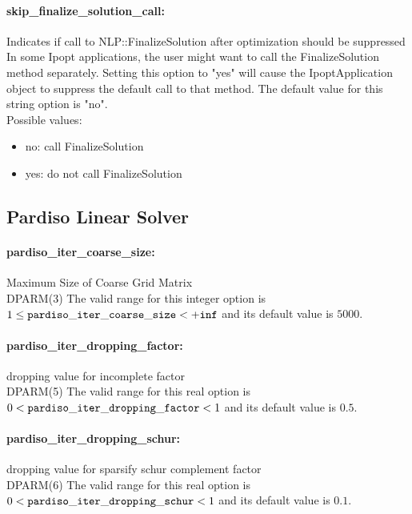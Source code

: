 \paragraph{skip\_finalize\_solution\_call:}\label{sec:skip_finalize_solution_call} Indicates if call to NLP::FinalizeSolution after optimization should be suppressed $\;$ \\
 In some Ipopt applications, the user might want
to call the FinalizeSolution method separately. 
Setting this option to "yes" will cause the
IpoptApplication object to suppress the default
call to that method.
The default value for this string option is "no".
\\ 
Possible values:
\begin{itemize}
   \item no: call FinalizeSolution
   \item yes: do not call FinalizeSolution
\end{itemize}

\subsection{Pardiso Linear Solver}
\label{sec:Pardiso_Linear_Solver}
\paragraph{pardiso\_iter\_coarse\_size:}\label{sec:pardiso_iter_coarse_size} Maximum Size of Coarse Grid Matrix $\;$ \\
 DPARM(3) The valid range for this integer option is
$1 \le {\tt pardiso\_iter\_coarse\_size } <  {\tt +inf}$
and its default value is $5000$.


\paragraph{pardiso\_iter\_dropping\_factor:}\label{sec:pardiso_iter_dropping_factor} dropping value for incomplete factor $\;$ \\
 DPARM(5) The valid range for this real option is 
$0 <  {\tt pardiso\_iter\_dropping\_factor } <  1$
and its default value is $0.5$.


\paragraph{pardiso\_iter\_dropping\_schur:}\label{sec:pardiso_iter_dropping_schur} dropping value for sparsify schur complement factor $\;$ \\
 DPARM(6) The valid range for this real option is 
$0 <  {\tt pardiso\_iter\_dropping\_schur } <  1$
and its default value is $0.1$.


